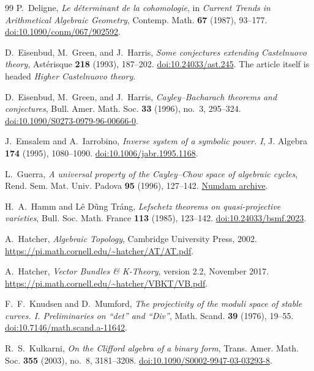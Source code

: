 \begin{thebibliography}{99}
P.~Deligne,
\emph{Le d\'eterminant de la cohomologie},
in \emph{Current Trends in Arithmetical Algebraic Geometry},
Contemp. Math. \textbf{67} (1987), 93--177.
\href{https://doi.org/10.1090/conm/067/902592}{doi:10.1090/conm/067/902592}.

D.~Eisenbud, M.~Green, and J.~Harris,
\emph{Some conjectures extending Castelnuovo theory},
Ast\'erisque \textbf{218} (1993), 187--202.
\href{https://doi.org/10.24033/ast.245}{doi:10.24033/ast.245}.
The article itself is headed \emph{Higher Castelnuovo theory}.

D.~Eisenbud, M.~Green, and J.~Harris,
\emph{Cayley--Bacharach theorems and conjectures},
Bull. Amer. Math. Soc. \textbf{33} (1996), no.~3, 295--324.
\href{https://doi.org/10.1090/S0273-0979-96-00666-0}{doi:10.1090/S0273-0979-96-00666-0}.

J.~Emsalem and A.~Iarrobino,
\emph{Inverse system of a symbolic power. I},
J. Algebra \textbf{174} (1995), 1080--1090.
\href{https://doi.org/10.1006/jabr.1995.1168}{doi:10.1006/jabr.1995.1168}.

L.~Guerra,
\emph{A universal property of the Cayley--Chow space of algebraic cycles},
Rend. Sem. Mat. Univ. Padova \textbf{95} (1996), 127--142.
\href{https://www.numdam.org/item/RSMUP_1996__95__127_0/}{Numdam archive}.

H.~A.~Hamm and L\^e D\~ung Tr\'ang,
\emph{Lefschetz theorems on quasi-projective varieties},
Bull. Soc. Math. France \textbf{113} (1985), 123--142.
\href{https://doi.org/10.24033/bsmf.2023}{doi:10.24033/bsmf.2023}.

A.~Hatcher,
\emph{Algebraic Topology},
Cambridge University Press, 2002.
\url{https://pi.math.cornell.edu/~hatcher/AT/AT.pdf}.

A.~Hatcher,
\emph{Vector Bundles \& K-Theory},
version 2.2, November 2017.
\url{https://pi.math.cornell.edu/~hatcher/VBKT/VB.pdf}.

F.~F.~Knudsen and D.~Mumford,
\emph{The projectivity of the moduli space of stable curves. I.
Preliminaries on ``det'' and ``Div''},
Math. Scand. \textbf{39} (1976), 19--55.
\href{https://doi.org/10.7146/math.scand.a-11642}{doi:10.7146/math.scand.a-11642}.

R.~S.~Kulkarni,
\emph{On the Clifford algebra of a binary form},
Trans. Amer. Math. Soc. \textbf{355} (2003), no.~8, 3181--3208.
\href{https://doi.org/10.1090/S0002-9947-03-03293-8}{doi:10.1090/S0002-9947-03-03293-8}.


\end{thebibliography}
